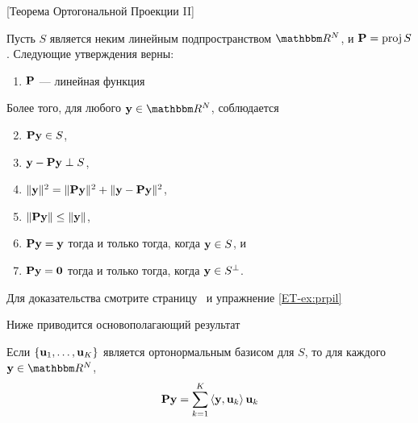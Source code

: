 \begin{frame}

    \vspace{2em}
    \Thm{\eqref{ET-t:opt2}}
    [Теорема Ортогональной Проекции II]
    
    Пусть $S$ является неким линейным подпространством $\RR^N$, и $\mathbf P = \operatorname{proj} S$.
    Следующие утверждения верны:
    \begin{enumerate}
        \item $\mathbf P$ --- линейная функция
    \end{enumerate}
    Более того, для любого $\boldy \in \RR^N$, соблюдается
    \begin{enumerate}
        \setcounter{enumi}{1}
        \item $\mathbf P {\mathbf y} \in S$,
        \item ${\mathbf y} - \mathbf P {\mathbf y} \perp S$,
        \item $\| {\mathbf y} \|^2 = \| \mathbf P {\mathbf y} \|^2 + \| {\mathbf y} - \mathbf P
            {\mathbf y} \|^2$,
        \item $\| \mathbf P {\mathbf y} \| \leq \| {\mathbf y} \|$,
        \item $\mathbf P {\mathbf y} = {\mathbf y}$ тогда и только тогда, когда ${\mathbf y} \in S$, и
        \item $\mathbf P {\mathbf y} = {\mathbf 0}$ тогда и только тогда, когда ${\mathbf y} \in
            S^{\perp}$.
    \end{enumerate}
    Для доказательства смотрите страницу~\pageref{ET-t:opt2} и
    упражнение \ref{ET-ex:prpil}
    
\end{frame}

\begin{frame}

    \vspace{2em}
    Ниже приводится основополагающий результат 
    
    \vspace{.7em}
    \Fact{\eqref{ET-fa:projon}}
    Если $\{{\mathbf u}_1, \ldots, {\mathbf u}_K\}$ является ортонормальным базисом для $S$, 
    то для каждого $\boldy \in \RR^N$,
    \begin{equation}
        \label{eq:projon}
        \mathbf P {\mathbf y} = \sum_{k=1}^K \left\langle{ {\mathbf y} ,  {\mathbf u} _k}\right\rangle {\mathbf u}_k
    \end{equation}
\end{frame}

